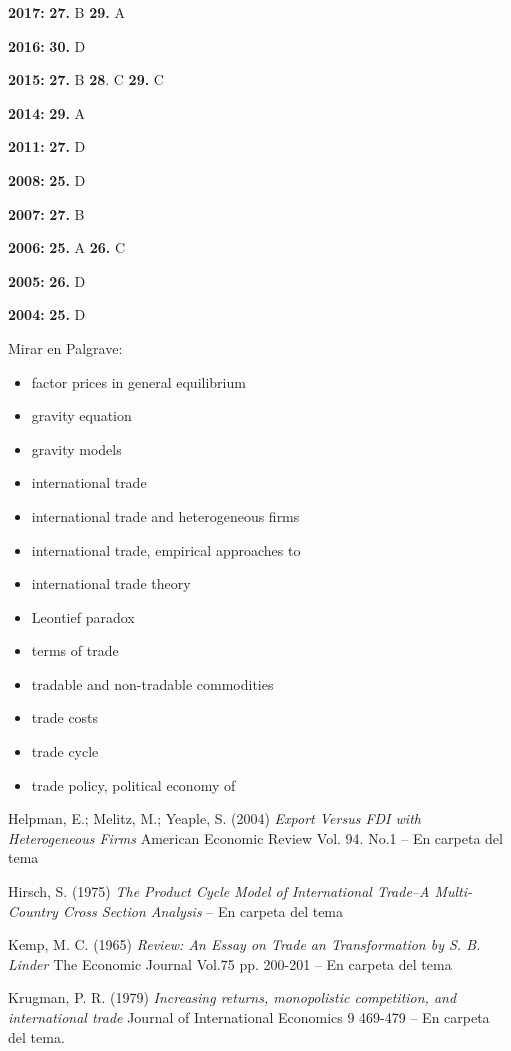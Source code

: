 \documentclass{nuevotema}
\begin{document}
\notas

\textbf{2017:} \textbf{27.} B \textbf{29.} A

\textbf{2016:} \textbf{30.} D

\textbf{2015:} \textbf{27.} B \textbf{28}. C \textbf{29.} C 

\textbf{2014:} \textbf{29.} A 

\textbf{2011:} \textbf{27.} D

\textbf{2008:} \textbf{25.} D

\textbf{2007:} \textbf{27.} B

\textbf{2006:} \textbf{25.} A \textbf{26.} C

\textbf{2005:} \textbf{26.} D

\textbf{2004:} \textbf{25.} D

\bibliografia

Mirar en Palgrave:
\begin{itemize}
	\item factor prices in general equilibrium
	\item gravity equation
	\item gravity models
	\item international trade
	\item international trade and heterogeneous firms
	\item international trade, empirical approaches to
	\item international trade theory
	\item Leontief paradox
	\item terms of trade
	\item tradable and non-tradable commodities
	\item trade costs
	\item trade cycle
	\item trade policy, political economy of
\end{itemize}

Helpman, E.; Melitz, M.; Yeaple, S. (2004) \textit{Export Versus FDI with Heterogeneous Firms} American Economic Review Vol. 94. No.1 -- En carpeta del tema

Hirsch, S. (1975) \textit{The Product Cycle Model of International Trade--A Multi-Country Cross Section Analysis} -- En carpeta del tema

Kemp, M. C. (1965) \textit{Review: An Essay on Trade an Transformation by S. B. Linder} {The Economic Journal} Vol.75 pp. 200-201 -- En carpeta del tema

Krugman, P. R. (1979) \textit{Increasing returns, monopolistic competition, and international trade} Journal of International Economics 9 469-479 -- En carpeta del tema.
\end{document}
